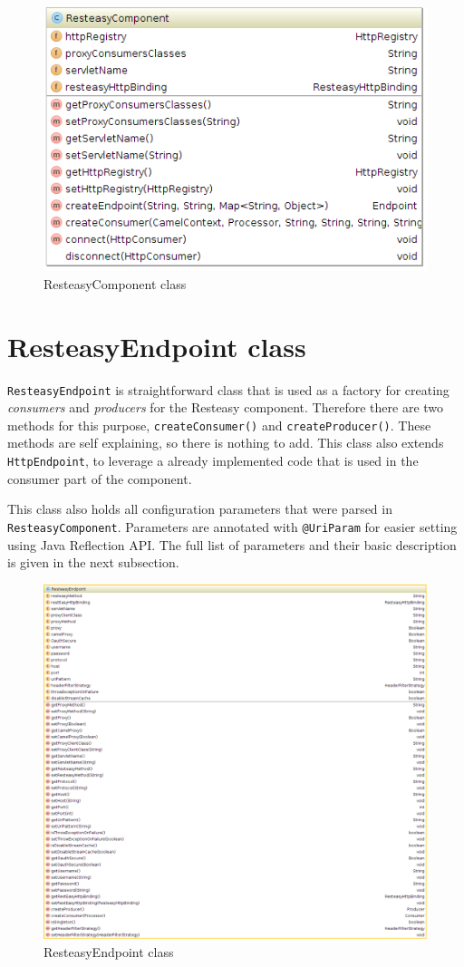 \documentclass[12pt,final,oneside]{fithesis2}
\begin{document}
\begin{figure}[h]
\centering
\includegraphics[width=0.8\linewidth]{images/component.png}
\caption{ResteasyComponent class}
\label{comp}
\end{figure}

\section{ResteasyEndpoint class}
\texttt{ResteasyEndpoint}  is straightforward class that is used as a factory for creating \textit{consumers} and \textit{producers} for the Resteasy component. Therefore there are two methods for this purpose, \texttt{createConsumer()} and \texttt{createProducer()}. These methods are self explaining, so there is nothing to add. This class also extends \texttt{HttpEndpoint}, to leverage a already implemented code that is used in the consumer part of the component.

This class also holds all configuration parameters that were parsed in \texttt{ResteasyComponent}. Parameters are annotated with \texttt{@UriParam} for easier setting using Java Reflection API. The full list of parameters and their basic description is given in the next subsection.

\begin{figure}
\centering
\includegraphics[width=0.9\linewidth]{images/endpoint.png}
\caption{ResteasyEndpoint class}
\label{endpoint}
\end{figure}
\end{document}
